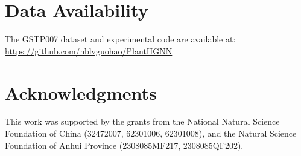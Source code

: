 \documentclass[11pt,a4paper]{article}
\begin{document}
\section*{Data Availability}

The GSTP007 dataset and experimental code are available at: \url{https://github.com/nblvguohao/PlantHGNN}

\section*{Acknowledgments}

This work was supported by the grants from the National Natural Science Foundation of China (32472007, 62301006, 62301008), and the Natural Science Foundation of Anhui Province (2308085MF217, 2308085QF202).
\end{document}
